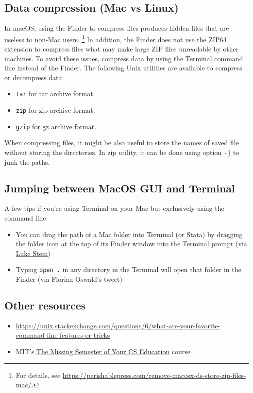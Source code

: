 \subsection{Data compression (Mac vs Linux)}
In macOS, using the Finder to compress files produces hidden files that are useless to non-Mac users.%
\footnote{For details, see \url{https://perishablepress.com/remove-macosx-ds-store-zip-files-mac/}.}
In addition, the Finder does not use the ZIP64 extension to compress files what may make large ZIP files unreadable by other machines.
To avoid these issues, compress data by using the Terminal command line instead of the Finder.
The following Unix utilities are available to compress or decompress data:
\begin{itemize}
	\item \texttt{tar} for tar archive format
	\item \texttt{zip} for zip archive format.
	\item \texttt{gzip} for gz archive format.
\end{itemize}

When compressing files, it might be also useful to store the names of saved file without storing the directories.
In zip utility, it can be done using option \texttt{-j} to junk the paths.


\subsection{Jumping between MacOS GUI and Terminal}

A few tips if you're using Terminal on your Mac but exclusively using the command line:
\begin{itemize}
	\item You can drag the path of a Mac folder into Terminal (or Stata) by dragging the folder icon at the top of its Finder window into the Terminal prompt (\href{https://twitter.com/lukestein/status/1179792864630296578}{via Luke Stein})
	\item Typing \texttt{open .} in any directory in the Terminal will open that folder in the Finder (via Florian Oswald's tweet)
\end{itemize}

\subsection{Other resources}

\begin{itemize}
	\item \url{https://unix.stackexchange.com/questions/6/what-are-your-favorite-command-line-features-or-tricks}
	\item MIT's \href{https://missing.csail.mit.edu/}{The Missing Semester of Your CS Education} course
\end{itemize}
